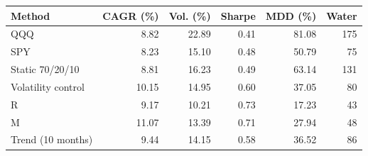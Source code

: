 \begin{tabular}{@{}lrrrrr@{}}\toprule
Method & CAGR (\%) & Vol. (\%) & Sharpe & MDD (\%) & Water\\\midrule
QQQ & 8.82 & 22.89 & 0.41 & 81.08 & 175\\
SPY & 8.23 & 15.10 & 0.48 & 50.79 & 75\\
Static 70/20/10 & 8.81 & 16.23 & 0.49 & 63.14 & 131\\
Volatility control & 10.15 & 14.95 & 0.60 & 37.05 & 80\\
R & 9.17 & 10.21 & 0.73 & 17.23 & 43\\
M & 11.07 & 13.39 & 0.71 & 27.94 & 48\\
Trend (10 months) & 9.44 & 14.15 & 0.58 & 36.52 & 86\\
\bottomrule
\end{tabular}
